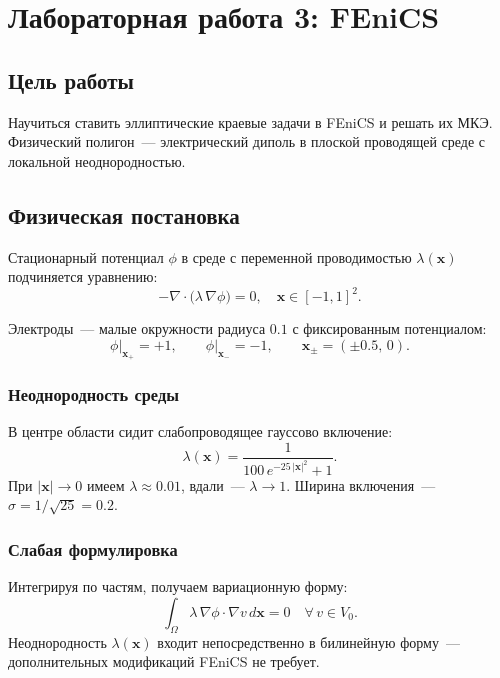 \section{Лабораторная работа \textnumero{}3: FEniCS}

\subsection{Цель работы}

Научиться ставить эллиптические краевые задачи в FEniCS
и решать их МКЭ. Физический полигон~--- электрический диполь
в плоской проводящей среде с локальной неоднородностью.

\subsection{Физическая постановка}

Стационарный потенциал $\phi$ в среде с переменной проводимостью
$\lambda(\mathbf{x})$ подчиняется уравнению:
\begin{equation}\label{eq:strong}
  -\nabla \cdot \bigl(\lambda\,\nabla \phi\bigr) = 0,
  \quad \mathbf{x} \in [-1, 1]^2.
\end{equation}

Электроды~--- малые окружности радиуса $0.1$ с фиксированным потенциалом:
\begin{equation}
  \phi\big|_{\mathbf{x}_+} = +1, \qquad \phi\big|_{\mathbf{x}_-} = -1,
  \qquad \mathbf{x}_\pm = (\pm 0.5,\, 0).
\end{equation}

\subsubsection{Неоднородность среды}

В центре области сидит слабопроводящее гауссово включение:
\begin{equation}\label{eq:lambda}
  \lambda(\mathbf{x}) = \frac{1}{100\,e^{-25\,|\mathbf{x}|^2} + 1}.
\end{equation}
При $|\mathbf{x}| \to 0$ имеем $\lambda \approx 0.01$,
вдали~--- $\lambda \to 1$. Ширина включения~--- $\sigma = 1/\sqrt{25} = 0.2$.

\subsubsection{Слабая формулировка}

Интегрируя по частям, получаем вариационную форму:
\begin{equation}\label{eq:weak}
  \int_\Omega \lambda\,\nabla \phi \cdot \nabla v\,d\mathbf{x} = 0
  \quad \forall\, v \in V_0.
\end{equation}
Неоднородность $\lambda(\mathbf{x})$ входит непосредственно в билинейную
форму~--- дополнительных модификаций FEniCS не требует.

